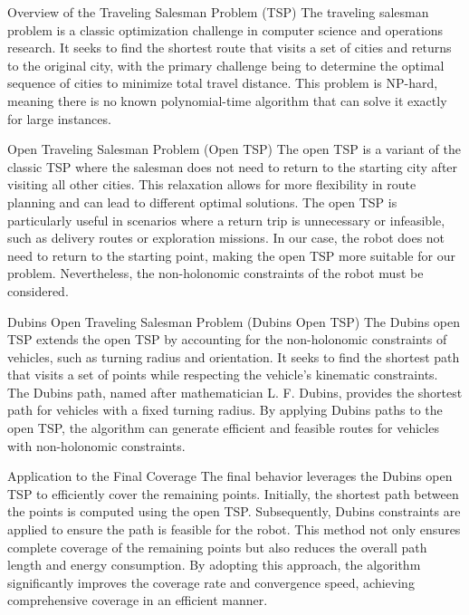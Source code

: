 \vspace*{6mm}   

Overview of the Traveling Salesman Problem (TSP)
The traveling salesman problem is a classic optimization challenge in computer science and operations research. It seeks to find the shortest route that visits a set of cities and returns to the original city, with the primary challenge being to determine the optimal sequence of cities to minimize total travel distance. This problem is NP-hard, meaning there is no known polynomial-time algorithm that can solve it exactly for large instances.

\vspace*{6mm}   

Open Traveling Salesman Problem (Open TSP)
The open TSP is a variant of the classic TSP where the salesman does not need to return to the starting city after visiting all other cities. This relaxation allows for more flexibility in route planning and can lead to different optimal solutions. The open TSP is particularly useful in scenarios where a return trip is unnecessary or infeasible, such as delivery routes or exploration missions. In our case, the robot does not need to return to the starting point, making the open TSP more suitable for our problem. Nevertheless, the non-holonomic constraints of the robot must be considered.

\vspace*{6mm}   

Dubins Open Traveling Salesman Problem (Dubins Open TSP)
The Dubins open TSP extends the open TSP by accounting for the non-holonomic constraints of vehicles, such as turning radius and orientation. It seeks to find the shortest path that visits a set of points while respecting the vehicle's kinematic constraints. The Dubins path, named after mathematician L. F. Dubins, provides the shortest path for vehicles with a fixed turning radius. By applying Dubins paths to the open TSP, the algorithm can generate efficient and feasible routes for vehicles with non-holonomic constraints.

\vspace*{6mm}   

Application to the Final Coverage
The final behavior leverages the Dubins open TSP to efficiently cover the remaining points. Initially, the shortest path between the points is computed using the open TSP. Subsequently, Dubins constraints are applied to ensure the path is feasible for the robot. This method not only ensures complete coverage of the remaining points but also reduces the overall path length and energy consumption. By adopting this approach, the algorithm significantly improves the coverage rate and convergence speed, achieving comprehensive coverage in an efficient manner.

